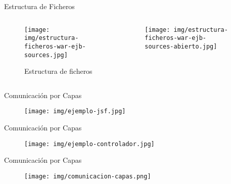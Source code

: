 \documentclass[spanish,xcolor=table,svgnames]{beamer}
\begin{document}
\begin{frame}{Estructura de Ficheros}
  \begin{columns}[onlytextwidth]
    \begin{column}{0.5\textwidth}
      \centering
      \begin{figure}[H]
        \begin{center}
        \texttt{[image: img/estructura-ficheros-war-ejb-sources.jpg]}
        \end{center}
        \caption{Estructura de ficheros}
        \label{fig:estructura-proyecto-4}
      \end{figure}
    \end{column}
    \begin{column}{0.5\textwidth}
      \centering
      \begin{figure}[H]
        \begin{center}
        \texttt{[image: img/estructura-ficheros-war-ejb-sources-abierto.jpg]}
        \end{center}
        \label{fig:estructura-web}
      \end{figure}
    \end{column}
  \end{columns}
\end{frame}


\begin{frame}{Comunicación por Capas}
  \begin{figure}[H]
    \begin{center}
        \texttt{[image: img/ejemplo-jsf.jpg]}
    \end{center}
    \label{fig:ejemplo-jsf}
  \end{figure}
\end{frame}

\begin{frame}{Comunicación por Capas}
  \begin{figure}[H]
    \begin{center}
        \texttt{[image: img/ejemplo-controlador.jpg]}
    \end{center}
    \label{fig:ejemplo-ejb}
  \end{figure}
\end{frame}

\begin{frame}{Comunicación por Capas}
  \begin{figure}[H]
    \begin{center}
        \texttt{[image: img/comunicacion-capas.png]}
    \end{center}
    \label{fig:comunicacion-capas}
  \end{figure}
\end{frame}
\end{document}
